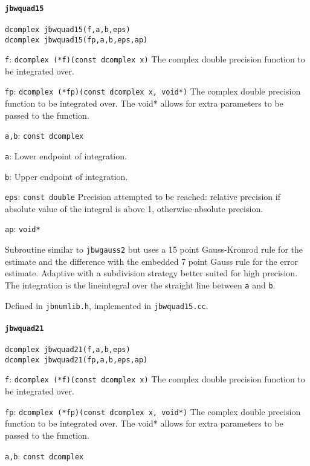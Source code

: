 \documentclass[12pt,a4paper]{article}
\newcommand{\mytt}[1]{\texttt{#1}}
\newcommand{\newfunction}[1]{\mytt{#1}\index{\mytt{#1}}}
\begin{document}
\paragraph{\newfunction{jbwquad15}}

\mytt{dcomplex jbwquad15(f,a,b,eps)}\\
\mytt{dcomplex jbwquad15(fp,a,b,eps,ap)}

\mytt{f}: \mytt{dcomplex (*f)(const dcomplex x)} The complex double precision
function to be integrated over.

\mytt{fp}: \mytt{dcomplex (*fp)(const dcomplex x, void*)} The complex double precision
function to be integrated over. The void* allows for extra parameters to be passed to the function.

\mytt{a,b}: \mytt{const dcomplex}

\mytt{a}: Lower endpoint of integration.

\mytt{b}: Upper endpoint of integration.

\mytt{eps}: \mytt{const double} Precision attempted to be reached:
relative precision if absolute
value of the integral is above 1, otherwise absolute precision.

\mytt{ap}: \mytt{void*}

Subroutine similar to \mytt{jbwgauss2} but uses a 15 point Gauss-Kronrod rule
for the estimate
and the difference with the embedded 7 point Gauss rule for the error estimate.
Adaptive with a subdivision strategy
better suited for high precision.
The integration is the
lineintegral over the straight line between \mytt{a} and \mytt{b}.

Defined in \mytt{jbnumlib.h}, implemented in \mytt{jbwquad15.cc}.

\paragraph{\newfunction{jbwquad21}}

\mytt{dcomplex jbwquad21(f,a,b,eps)}\\
\mytt{dcomplex jbwquad21(fp,a,b,eps,ap)}

\mytt{f}: \mytt{dcomplex (*f)(const dcomplex x)} The complex double precision
function to be integrated over.

\mytt{fp}: \mytt{dcomplex (*fp)(const dcomplex x, void*)} The complex double precision
function to be integrated over. The void* allows for extra parameters to be passed to the function.

\mytt{a,b}: \mytt{const dcomplex}
\end{document}
